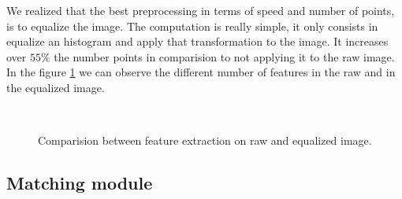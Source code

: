 We realized that the best preprocessing in terms of speed and number of points, is to equalize the image. The computation is really simple, it only consists in equalize an histogram and apply that transformation to the image. It increases over $ 55 \%$ the number points in comparision to not applying it to the raw image. In the figure \ref{experiTrack4} we can observe the different number of features in the raw and in the equalized image.

\begin{figure}[H]
		
\centering

\\
\caption{Comparision between feature extraction on raw and equalized image.}
\label{experiTrack4}
\end{figure}


\subsection{Matching module}


